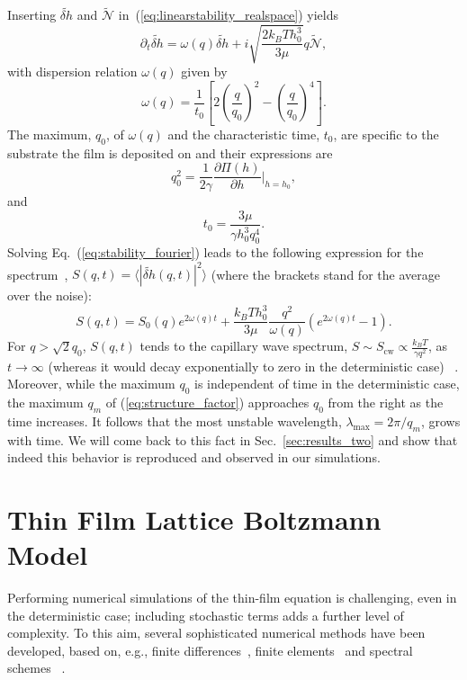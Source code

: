 Inserting $\tilde{\delta h}$ and $\tilde{\mathcal{N}}$ in~(\ref{eq:linearstability_realspace}) yields
\begin{equation}\label{eq:stability_fourier}
    \partial_t \tilde{\delta h} = \omega(q)\tilde{\delta h} +i\sqrt{\frac{2k_BTh_0^3}{3\mu}}q\tilde{\mathcal{N}},
\end{equation}
with dispersion relation $\omega(q)$ given by
\begin{equation}\label{eq:dispersion}
    \omega(q) = \frac{1}{t_0}\left[2\left(\frac{q}{q_0}\right)^2 - \left(\frac{q}{q_0}\right)^4\right].
\end{equation}
The maximum, $q_0$, of $\omega(q)$ and the characteristic time, $t_0$, are specific to the substrate the film is deposited on and their expressions are~\cite{fetzerThermalNoiseInfluences2007}
\begin{equation}\label{eq:q0}
    q_0^2 = \frac{1}{2\gamma}\frac{\partial \Pi(h)}{\partial h}\bigg\rvert_{h=h_0},
\end{equation}
and
\begin{equation}\label{eq:t0}
    t_0 = \frac{3\mu}{\gamma h_0^3 q_0^4}.
\end{equation}
Solving Eq.~(\ref{eq:stability_fourier}) leads to the following expression for the spectrum~\cite{zhangMolecularSimulationThin2019,meckeThermalFluctuationsThin2005},
$S(q,t) = \langle |\tilde{\delta h}(q,t)|^2\rangle$ (where the brackets stand for the average over the noise):
\begin{equation}\label{eq:structure_factor}
    S(q,t) = S_0(q)e^{2\omega(q)t} + \frac{k_BTh_0^3}{3\mu}\frac{q^2}{\omega(q)}(e^{2\omega(q)t} - 1).
\end{equation}
For $q>\sqrt{2}q_0$, $S(q,t)$ tends to the capillary wave spectrum, 
$S \sim S_{\text{cw}} \propto \frac{k_BT}{\gamma q^2}$, as $t \rightarrow \infty$ (whereas it would decay exponentially to zero in the deterministic case) ~\cite{fetzerThermalNoiseInfluences2007,meckeThermalFluctuationsThin2005}.
Moreover, while the maximum $q_0$ is independent of time in the deterministic case, the maximum $q_m$ of 
(\ref{eq:structure_factor}) approaches $q_0$ from the right as the time increases.
It follows that the most unstable wavelength, $\lambda_{\text{max}} = 2\pi/q_m$, grows with time.
We will come back to this fact in Sec.~\ref{sec:results_two} and show that indeed this behavior is reproduced and observed in our simulations.

\section{Thin Film Lattice Boltzmann Model}\label{sec:num_method}
Performing numerical simulations of the thin-film equation is challenging, even in the deterministic case;
including stochastic terms adds a further level of complexity.
To this aim, several sophisticated numerical methods have been developed, based on, e.g.,   
finite differences~\cite{diezGlobalModelsMoving2000}, finite elements~\cite{grunThinFilmFlowInfluenced2006} and spectral schemes~\cite{duran-olivenciaInstabilityRuptureFluctuations2019} . 

